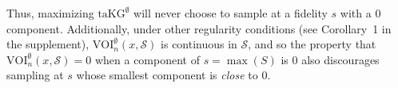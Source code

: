 \documentclass[letterpaper]{article}
\newcommand{\VOIE}{\text{VOI}^\emptyset}
\newcommand{\taKG}{\text{taKG}}
\newcommand{\taKGE}{\text{taKG}^\emptyset}
\numberwithin{equation}{section}
\newcommand{\pfcomment}[1]{{\color{blue} PF: #1}}
\renewcommand{\S}{\mathcal{S}}
\begin{document}
Thus, maximizing $\taKGE$ will never choose to sample at a fidelity $s$ with a $0$ component.
Additionally, under other regularity conditions (see Corollary~1 in the supplement), $\VOIE_n(x,\S)$ is continuous in $\S$, and so the property that $\VOIE_n(x,\S)=0$ when a component of $s=\max(S)$ is 0 also discourages sampling at $s$ whose smallest component is {\it close} to 0.




\end{document}
